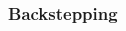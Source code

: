 \begin{frame}
\frametitle{Backstepping}
%
\begin{columns}
	\begin{column}{0.5\textwidth}
	\begin{figure}
	\end{figure}
	\end{column}
	\begin{column}{0.5\textwidth}
	\begin{figure}
	\end{figure}
	\end{column}
\end{columns}
\end{frame}
